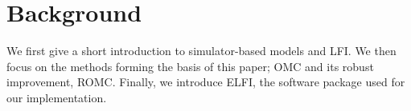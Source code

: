 \documentclass[article]{jss}
\newcommand{\fct}[1]{\code{#1()}}
\begin{document}





\section{Background}
We first give a short introduction to simulator-based models and
LFI. We then focus on the methods forming the basis of this paper; OMC
and its robust improvement, ROMC. Finally, we introduce ELFI, the
software package used for our implementation.
\end{document}
